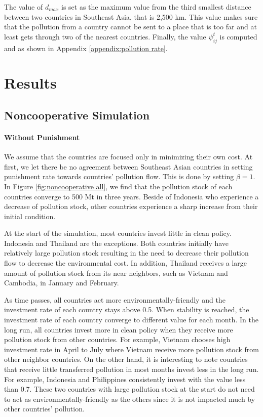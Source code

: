 \documentclass[a4paper,fleqn]{cas-dc}
\begin{document}
The value of $d_{max}$ is set as the maximum value from the third smallest distance between two countries in Southeast Asia, that is 2,500 km. This value makes sure that the pollution from a country cannot be sent to a place that is too far and at least gets through two of the nearest countries. Finally, the value $\psi_{ij}^t$ is computed and as shown in Appendix \ref{appendix:pollution rate}.

\section{Results}

\subsection{Noncooperative Simulation}

\paragraph{Without Punishment}
We assume that the countries are focused only in minimizing their own cost. At first, we let there be no agreement between Southeast Asian countries in setting punishment rate towards countries' pollution flow. This is done by setting $\beta=1$. In Figure \ref{fig:noncooperative all}, we find that the pollution stock of each countries converge to 500 Mt in three years. Beside of Indonesia who experience a decrease of pollution stock, other countries experience a sharp increase from their initial condition.

At the start of the simulation, most countries invest little in clean policy. Indonesia and Thailand are the exceptions. Both countries initially have relatively large pollution stock resulting in the need to decrease their pollution flow to decrease the environmental cost. In addition, Thailand receives a large amount of pollution stock from its near neighbors, such as Vietnam and Cambodia, in January and February.

As time passes, all countries act more environmentally-friendly and the investment rate of each country stays above 0.5. When stability is reached, the investment rate of each country converge to different value for each month. In the long run, all countries invest more in clean policy when they receive more pollution stock from other countries. For example, Vietnam chooses high investment rate in April to July where Vietnam receive more pollution stock from other neighbor countries. On the other hand, it is interesting to note countries that receive little transferred pollution in most months invest less in the long run. For example, Indonesia and Philippines consistently invest with the value less than 0.7. These two countries with large pollution stock at the start do not need to act as environmentally-friendly as the others since it is not impacted much by other countries' pollution.
\end{document}
